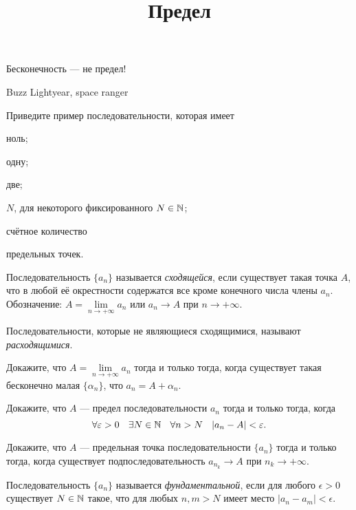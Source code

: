 \documentclass[a4paper, 12pt, num=30]{listok}
\begin{document}
\title{Предел}
\maketitle{}

\epigraph{%
    Бесконечность --- не предел!
}{%
    Buzz Lightyear, space ranger
}
\begin{problem}
    Приведите пример последовательности, которая имеет
    \begin{probparts}
        \item ноль;
        \item одну;
        \item две;
        \item $N$, для некоторого фиксированного $N \in \mathbb{N}$;
        \item счётное количество
    \end{probparts}
    предельных точек.
\end{problem}
\begin{definition}
    Последовательность $\{a_n\}$ называется \textit{сходящейся}, если существует такая точка $A$, что в любой её окрестности содержатся все кроме конечного числа члены $a_n$.
    Обозначение: $A = \lim\limits_{n \to +\infty} a_n$ или $a_n \to A$ при $n \to +\infty$.

    Последовательности, которые не являющиеся сходящимися, называют \textit{расходящимися}.
\end{definition}
\begin{problem}
    Докажите, что $A = \lim\limits_{n \to +\infty} a_n$ тогда и только тогда, когда существует такая бесконечно малая $\{\alpha_n\}$, что $a_n = A + \alpha_n$.
\end{problem}
\begin{problem}
    Докажите, что $A$ --- предел последовательности $a_n$ тогда и только тогда, когда
    \[
        \forall{\epsilon > 0}\exists{N \in \N}\forall{n > N} |a_n - A| < \epsilon.
    \]
\end{problem}
\begin{problem}
    Докажите, что $A$ --- предельная точка последовательности $\{a_n\}$ тогда и только тогда, когда существует подпоследовательность $a_{n_k} \to A$ при $n_k \to +\infty$.
\end{problem}
\begin{definition}
    Последовательность $\{a_n\}$ называется \textit{фундаментальной}, если для любого $\epsilon > 0$ существует $N \in \mathbb{N}$ такое,
    что для любых $n, m > N$ имеет место  $|a_n - a_m| < \epsilon$.
\end{definition}
\end{document}
